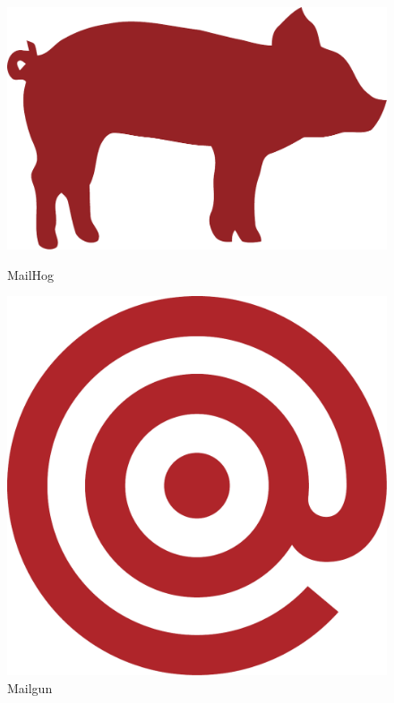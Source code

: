 \begin{figure}[!h]
    \centering
    \begin{minipage}[c]{0.4\textwidth}
        \centering
        \includegraphics[scale=0.215]
        {textures/images/tools/mailhog.pdf}
        \caption{MailHog}\label{fig:mailhog}
    \end{minipage} \qquad
    \begin{minipage}[c]{0.4\textwidth}
        \centering
        \includegraphics[scale=0.14]
        {textures/images/tools/mailgun.pdf}
        \caption{Mailgun}\label{fig:mailgun}
    \end{minipage}
\end{figure}

